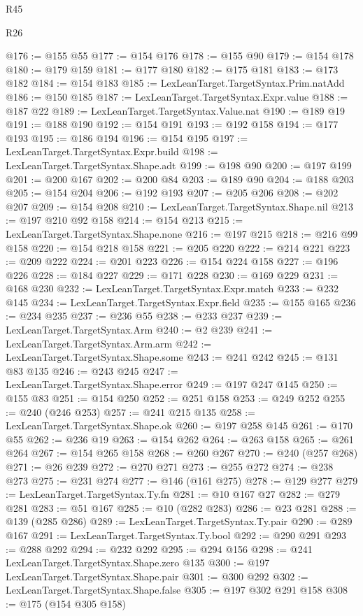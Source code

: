 \begin{lexlean}{R45}
\begin{lexlean}{R26}
\begin{coremodule}
{{{{{{{{{{{{{{{{{{{{{{{{{{{{{{{{{{{{{{{{{{{{{{{{{{{{{{{{{{{{{{{{{{{{{{{{@176 := @155 @55
@177 := @154 @176
@178 := @155 @90
@179 := @154 @178
@180 := @179 @159
@181 := @177 @180
@182 := @175 @181
@183 := @173 @182
@184 := @154 @183
@185 := LexLeanTarget.TargetSyntax.Prim.natAdd
@186 := @150 @185
@187 := LexLeanTarget.TargetSyntax.Expr.value
@188 := @187 @22
@189 := LexLeanTarget.TargetSyntax.Value.nat
@190 := @189 @19
@191 := @188 @190
@192 := @154 @191
@193 := @192 @158
@194 := @177 @193
@195 := @186 @194
@196 := @154 @195
@197 := LexLeanTarget.TargetSyntax.Expr.build
@198 := LexLeanTarget.TargetSyntax.Shape.adt
@199 := @198 @90
@200 := @197 @199
@201 := @200 @167
@202 := @200 @84
@203 := @189 @90
@204 := @188 @203
@205 := @154 @204
@206 := @192 @193
@207 := @205 @206
@208 := @202 @207
@209 := @154 @208
@210 := LexLeanTarget.TargetSyntax.Shape.nil
@213 := @197 @210 @92 @158
@214 := @154 @213
@215 := LexLeanTarget.TargetSyntax.Shape.none
@216 := @197 @215
@218 := @216 @99 @158
@220 := @154 @218 @158
@221 := @205 @220
@222 := @214 @221
@223 := @209 @222
@224 := @201 @223
@226 := @154 @224 @158
@227 := @196 @226
@228 := @184 @227
@229 := @171 @228
@230 := @169 @229
@231 := @168 @230
@232 := LexLeanTarget.TargetSyntax.Expr.match
@233 := @232 @145
@234 := LexLeanTarget.TargetSyntax.Expr.field
@235 := @155 @165
@236 := @234 @235
@237 := @236 @55
@238 := @233 @237
@239 := LexLeanTarget.TargetSyntax.Arm
@240 := @2 @239
@241 := LexLeanTarget.TargetSyntax.Arm.arm
@242 := LexLeanTarget.TargetSyntax.Shape.some
@243 := @241 @242
@245 := @131 @83 @135
@246 := @243 @245
@247 := LexLeanTarget.TargetSyntax.Shape.error
@249 := @197 @247 @145
@250 := @155 @83
@251 := @154 @250
@252 := @251 @158
@253 := @249 @252
@255 := @240 (@246 @253)
@257 := @241 @215 @135
@258 := LexLeanTarget.TargetSyntax.Shape.ok
@260 := @197 @258 @145
@261 := @170 @55
@262 := @236 @19
@263 := @154 @262
@264 := @263 @158
@265 := @261 @264
@267 := @154 @265 @158
@268 := @260 @267
@270 := @240 (@257 @268)
@271 := @26 @239
@272 := @270 @271
@273 := @255 @272
@274 := @238 @273
@275 := @231 @274
@277 := @146 (@161 @275)
@278 := @129 @277
@279 := LexLeanTarget.TargetSyntax.Ty.fn
@281 := @10 @167 @27
@282 := @279 @281
@283 := @51 @167
@285 := @10 (@282 @283)
@286 := @23 @281
@288 := @139 (@285 @286)
@289 := LexLeanTarget.TargetSyntax.Ty.pair
@290 := @289 @167
@291 := LexLeanTarget.TargetSyntax.Ty.bool
@292 := @290 @291
@293 := @288 @292
@294 := @232 @292
@295 := @294 @156
@298 := @241 LexLeanTarget.TargetSyntax.Shape.zero @135
@300 := @197 LexLeanTarget.TargetSyntax.Shape.pair
@301 := @300 @292
@302 := LexLeanTarget.TargetSyntax.Shape.false
@305 := @197 @302 @291 @158
@308 := @175 (@154 @305 @158)
}}}}}}}}}}}}}}}}}}}}}}}}}}}}}}}}}}}}}}}}}}}}}}}}}}}}}}}}}}}}}}}}}}}}}}}}
\end{coremodule}
\end{lexlean}
\end{lexlean}
